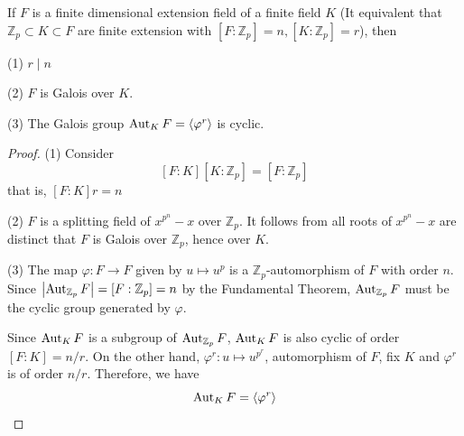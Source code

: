 \begin{theorem}
    If $F$ is a finite dimensional extension field of a finite field $K$ (It equivalent that $\mathbb{Z}_p\subset K \subset F$ are finite extension with $\left[F:\mathbb{Z}_p\right]=n,\left[K:\mathbb{Z}_p\right]=r$), then

    (1) $r \mid n$

    (2) $F$ is Galois over $K$.

    (3) The Galois group $\operatorname{\operatorname{Aut}}_K F= \langle \varphi^r \rangle$ is cyclic.
    \begin{proof}
        (1)
        Consider
        \begin{equation*}
            \left[F:K\right]\left[K:\mathbb{Z}_p\right]
            =
            \left[F:\mathbb{Z}_p\right]
        \end{equation*}
        that is, $\left[F:K\right]r=n$

        (2)
        $F$ is a splitting field of $x^{p^n}-x$ over $\mathbb{Z}_p$.
        It follows from all roots of $x^{p^n}-x$ are distinct that $F$ is Galois over $\mathbb{Z}_p$, hence over $K$.

        (3)
        The map $\varphi: F \rightarrow F$ given by $u \mapsto u^p$ is a $\mathbb{Z}_p$-automorphism of $F$ with order $n$.
        Since $\left|\operatorname{\operatorname{Aut}}_{\mathbb{Z}_p} F\right|=\left[F:\mathbb{Z}_p\right]=n$ by the Fundamental Theorem, $\operatorname{\operatorname{Aut}}_{\mathbb{Z}_p} F$ must be the cyclic group generated by $\varphi$.

        Since $\operatorname{\operatorname{Aut}}_K F$ is a subgroup of $\operatorname{\operatorname{Aut}}_{\mathbb{Z}_p} F$, $\operatorname{\operatorname{Aut}}_K F$ is also cyclic of order $\left[F:K\right] = n/r$.
        On the other hand, $\varphi^r: u \mapsto u^{p^r}$, automorphism of $F$, fix $K$ and $\varphi^r$ is of order $n/r$.
        Therefore, we have
        \begin{equation*}
            \operatorname{\operatorname{Aut}}_K F =\langle \varphi^r \rangle
        \end{equation*}
    \end{proof}
\end{theorem}








